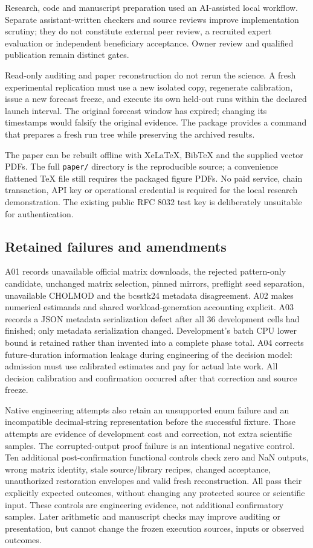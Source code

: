 \documentclass[11pt,a4paper]{article}
\begin{document}
Research, code and manuscript preparation used an AI-assisted local workflow. Separate assistant-written checkers and source reviews improve implementation scrutiny; they do not constitute external peer review, a recruited expert evaluation or independent beneficiary acceptance. Owner review and qualified publication remain distinct gates.

Read-only auditing and paper reconstruction do not rerun the science. A fresh experimental replication must use a new isolated copy, regenerate calibration, issue a new forecast freeze, and execute its own held-out runs within the declared launch interval. The original forecast window has expired; changing its timestamps would falsify the original evidence. The package provides a command that prepares a fresh run tree while preserving the archived results.

The paper can be rebuilt offline with XeLaTeX, BibTeX and the supplied vector PDFs. The full \texttt{paper/} directory is the reproducible source; a convenience flattened TeX file still requires the packaged figure PDFs. No paid service, chain transaction, API key or operational credential is required for the local research demonstration. The existing public RFC 8032 test key is deliberately unsuitable for authentication.

\subsection{Retained failures and amendments}
A01 records unavailable official matrix downloads, the rejected pattern-only candidate, unchanged matrix selection, pinned mirrors, preflight seed separation, unavailable CHOLMOD and the bcsstk24 metadata disagreement. A02 makes numerical estimands and shared workload-generation accounting explicit. A03 records a JSON metadata serialization defect after all 36 development cells had finished; only metadata serialization changed. Development's batch CPU lower bound is retained rather than invented into a complete phase total. A04 corrects future-duration information leakage during engineering of the decision model: admission must use calibrated estimates and pay for actual late work. All decision calibration and confirmation occurred after that correction and source freeze.

Native engineering attempts also retain an unsupported enum failure and an incompatible decimal-string representation before the successful fixture. Those attempts are evidence of development cost and correction, not extra scientific samples. The corrupted-output proof failure is an intentional negative control. Ten additional post-confirmation functional controls check zero and NaN outputs, wrong matrix identity, stale source/library recipes, changed acceptance, unauthorized restoration envelopes and valid fresh reconstruction. All pass their explicitly expected outcomes, without changing any protected source or scientific input. These controls are engineering evidence, not additional confirmatory samples. Later arithmetic and manuscript checks may improve auditing or presentation, but cannot change the frozen execution sources, inputs or observed outcomes.
\end{document}
